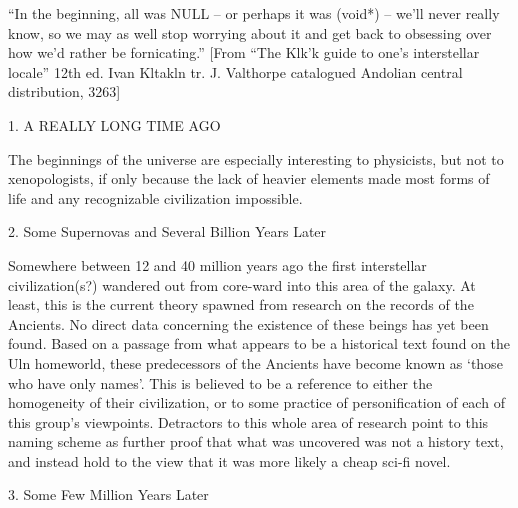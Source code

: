 “In the beginning, all was NULL – or perhaps it was (void*) – we’ll never really know, so we may as well stop worrying about it and get back to obsessing over how we’d rather be fornicating.” [From “The Klk’k guide to one’s interstellar locale” 12th ed. Ivan Kltakln tr. J. Valthorpe catalogued Andolian central distribution, 3263]

1. A REALLY LONG TIME AGO

The beginnings of the universe are especially interesting to physicists, but not to xenopologists, if only because the lack of heavier elements made most forms of life and any recognizable civilization impossible.

2. Some Supernovas and Several Billion Years Later

Somewhere between 12 and 40 million years ago the first interstellar civilization(s?) wandered out from core-ward into this area of the galaxy. At least, this is the current theory spawned from research on the records of the Ancients. No direct data concerning the existence of these beings has yet been found. Based on a passage from what appears to be a historical text found on the Uln homeworld, these predecessors of the Ancients have become known as ‘those who have only names’. This is believed to be a reference to either the homogeneity of their civilization, or to some practice of personification of each of this group’s viewpoints. Detractors to this whole area of research point to this naming scheme as further proof that what was uncovered was not a history text, and instead hold to the view that it was more likely a cheap sci-fi novel.

3. Some Few Million Years Later


